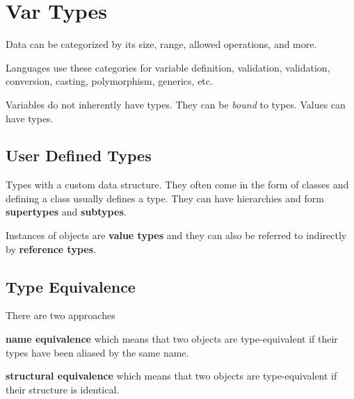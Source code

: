 \section{Var Types}
Data can be categorized by its size, range, allowed operations, and more.

Languages use these categories for variable definition, validation,
validation, conversion, casting, polymorphism, generics, etc.

Variables do not inherently have types. They can be \textit{bound} to
types. Values can have types.

\subsection*{User Defined Types}
Types with a custom data structure. They often come in the form of
classes and defining a class usually defines a type. They can have
hierarchies and  form \textbf{supertypes} and \textbf{subtypes}.

Instances of objects are \textbf{value types} and they can also be
referred to indirectly by \textbf{reference types}.

\subsection*{Type Equivalence}
There are two approaches

\textbf{name equivalence} which means that two objects are
type-equivalent if their types have been aliased by the same name.

\textbf{structural equivalence} which means that two objects are
type-equivalent if their structure is identical.